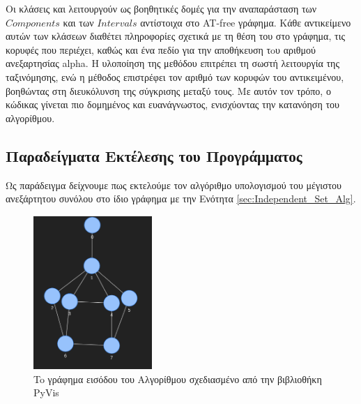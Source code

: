 

Οι κλάσεις  και  λειτουργούν ως βοηθητικές δομές για την αναπαράσταση των $Components$ και των $Intervals$ αντίστοιχα στο AT-free γράφημα. Κάθε αντικείμενο αυτών των κλάσεων διαθέτει πληροφορίες σχετικά με τη θέση του στο γράφημα, τις κορυφές που περιέχει, καθώς και ένα πεδίο για την αποθήκευση τoυ αριθμού ανεξαρτησίας alpha. Η υλοποίηση της μεθόδου  επιτρέπει τη σωστή λειτουργία της ταξινόμησης, ενώ η μέθοδος  επιστρέφει τον αριθμό των κορυφών του αντικειμένου, βοηθώντας στη διευκόλυνση της σύγκρισης μεταξύ τους. Με αυτόν τον τρόπο, ο κώδικας γίνεται πιο δομημένος και ευανάγνωστος, ενισχύοντας την κατανόηση του αλγορίθμου.

\subsection{Παραδείγματα Εκτέλεσης του Προγράμματος}

Ως παράδειγμα δείχνουμε πως εκτελούμε τον αλγόριθμο υπολογισμού του μέγιστου ανεξάρτητου συνόλου στο ίδιο γράφημα με την Ενότητα \ref{sec:Independent_Set_Alg}. 
 


\begin{figure}[H]
	\centering
	\includegraphics[width=0.4\textwidth]{pictures/at-free-graph-pyvis.png} 
	\caption{To γράφημα εισόδου του Αλγορίθμου σχεδιασμένο από την βιβλιοθήκη PyVis}
	\label{fig:at-free-graph-pyvis}
\end{figure}

